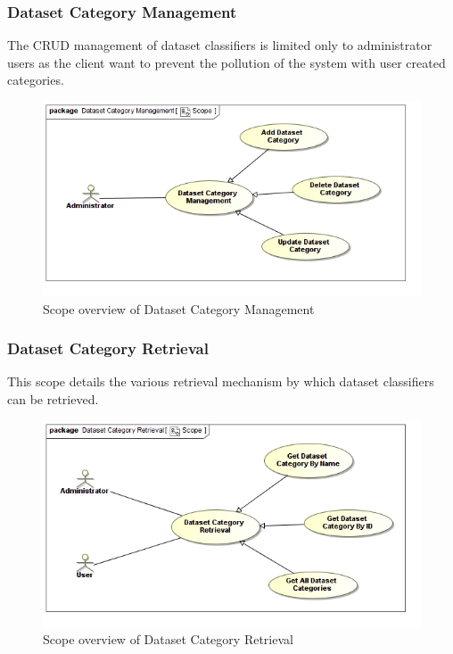\subsubsection{Dataset Category Management}
The CRUD management of dataset classifiers is limited only to administrator
users as the client want to prevent the pollution of the system with user
created categories.
\begin{figure}[H]
  \begin{center}
  \includegraphics[scale=0.38]{../Diagrams and Charts/Repository Management/Dataset Category Management Scope.jpg}
  \caption{Scope overview of Dataset Category Management}
  \end{center}  
\end{figure}

\subsubsection{Dataset Category Retrieval}
This scope details the various retrieval mechanism by which dataset classifiers 
can be retrieved.
\begin{figure}[H]
  \begin{center}
  \includegraphics[scale=0.38]{../Diagrams and Charts/Repository Management/Dataset Category Retrieval Scope.jpg}
  \caption{Scope overview of Dataset Category Retrieval}
  \end{center}  
\end{figure}

